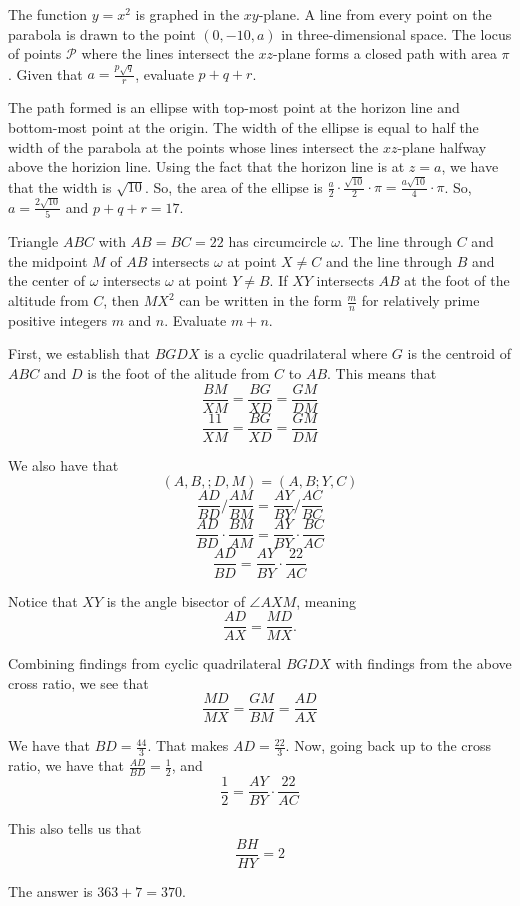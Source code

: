 \documentclass[11pt]{scrartcl}
\begin{document}
\begin{problem}
    The function $y = x^{2}$ is graphed in the $xy$-plane. A line from every point on the parabola is drawn to the point $(0, -10, a)$ in three-dimensional space. The locus of points $\mathcal{P}$ where the lines intersect the $xz$-plane forms a closed path with area $\pi$. Given that $a = \frac{p\sqrt{q}}{r}$, evaluate $p + q + r$.
\end{problem}

\begin{soln}
    The path formed is an ellipse with top-most point at the horizon line and bottom-most point at the origin. The width of the ellipse is equal to half the width of the parabola at the points whose lines intersect the $xz$-plane halfway above the horizion line. Using the fact that the horizon line is at $z = a$, we have that the width is $\sqrt{10}$. So, the area of the ellipse is $\frac{a}{2} \cdot \frac{\sqrt{10}}{2} \cdot \pi = \frac{a\sqrt{10}}{4} \cdot \pi$. So, $a = \frac{2\sqrt{10}}{5}$ and $p + q + r = 17$.
\end{soln}

\begin{problem}
    Triangle $ABC$ with $AB = BC = 22$ has circumcircle $\omega$. The line through $C$ and the midpoint $M$ of $AB$ intersects $\omega$ at point $X \neq C$ and the line through $B$ and the center of $\omega$ intersects $\omega$ at point $Y \neq B$. If $XY$ intersects $AB$ at the foot of the altitude from $C$, then $MX^{2}$ can be written in the form $\frac{m}{n}$ for relatively prime positive integers $m$ and $n$. Evaluate $m + n$.
\end{problem}

\begin{soln}
    First, we establish that $BGDX$ is a cyclic quadrilateral where $G$ is the centroid of $ABC$ and $D$ is the foot of the alitude from $C$ to $AB$. This means that
    \[\frac{BM}{XM} = \frac{BG}{XD} = \frac{GM}{DM}\]
    \[\frac{11}{XM} = \frac{BG}{XD} = \frac{GM}{DM}\]

    We also have that
    \[(A,B,;D,M) = (A,B;Y,C)\]
    \[\frac{AD}{BD} / \frac{AM}{BM} = \frac{AY}{BY} / \frac{AC}{BC}\]
    \[\frac{AD}{BD} \cdot \frac{BM}{AM} = \frac{AY}{BY} \cdot \frac{BC}{AC}\]
    \[\frac{AD}{BD} = \frac{AY}{BY} \cdot \frac{22}{AC}\]

    Notice that $XY$ is the angle bisector of $\angle AXM$, meaning
    \[\frac{AD}{AX} = \frac{MD}{MX}.\]

    Combining findings from cyclic quadrilateral $BGDX$ with findings from the above cross ratio, we see that
    \[\frac{MD}{MX} = \frac{GM}{BM} = \frac{AD}{AX}\]

    We have that $BD = \frac{44}{3}$. That makes $AD = \frac{22}{3}$. Now, going back up to the cross ratio, we have that $\frac{AD}{BD} = \frac{1}{2}$, and
    \[\frac{1}{2} = \frac{AY}{BY} \cdot \frac{22}{AC}\]

    This also tells us that
    \[\frac{BH}{HY} = 2\]

    The answer is $363 + 7 = 370$.
\end{soln}
\end{document}
